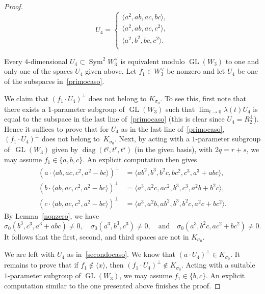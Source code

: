 \documentclass[JEP,XML,SOM,Unicode, NoEqCountersInSection,NoFloatCountersInSection]{cedram}
\theoremstyle{definition}
\let\la\langle
\let\ra\rangle
\DeclareMathOperator{\GL}{GL}
\DeclareMathOperator{\Sym}{Sym}
\DeclareMathOperator{\diag}{diag}
\begin{document}
\begin{proof}
\begin{minipage}[m]{.5\textwidth}
\end{minipage}
\hfill
{}
\hfill
\begin{minipage}[m]{.4\textwidth}
\begin{equation}\label{secondocaso}
U_4=
\begin{cases}
\la a^2,ab,ac,bc\ra, \\
\la a^2,ab,ac,c^2\ra, \\
\la a^2,b^2,bc,c^2\ra.\\
\end{cases}
\end{equation}
\end{minipage}
\par\smallskip\noindent
Every $4$-dimensional $U_4\subset \Sym^2 \!W^{\vee}_3$ is equivalent modulo $\GL(W_3)$ to one and only one of the spaces $U_4$ given above. Let $ f_1\in W_3^{\vee}$ be nonzero and let $U_4$ be one of the subspaces in~\eqref{primocaso}.

We claim that $(f_1\cdot U_4)^{\bot}$ does not belong to $K_{\sigma_0}$. To see this, first note that there exists a $1$-parameter subgroup of $\GL(W_3)$ such that $\lim_{t\to 0}\lambda(t)U_4$ is equal to the subspace in the last line of~\eqref{primocaso} (this is clear since $U_4=R_2^{\bot}$). Hence it suffices
to prove that for $U_4$ as in the last line of~\eqref{primocaso}, $(f_1\cdot U_4)^{\bot}$ does not belong to~$K_{\sigma_0}$. Next, by acting with a $1$-parameter subgroup of~$\GL(W_3)$ given by $\diag(t^q,t^r,t^s)$ (in the given basis), with $2q=r+s$, we may assume $f_1\in\{a,b,c\}$. An explicit computation then gives
\begin{align*}
(a\cdot \la ab,ac,c^2,a^2-bc\ra)^{\bot} & = \la ab^2,b^3,b^2c,bc^2,c^3,a^3+abc\ra, \\
(b\cdot \la ab,ac,c^2,a^2-bc\ra)^{\bot} & = \la a^3,a^2 c,ac^2,b^3,c^3,a^2b+b^2c\ra, \\
(c\cdot \la ab,ac,c^2,a^2-bc\ra)^{\bot} & = \la a^3,a^2 b,ab^2,b^3,b^2c,a^2c+bc^2\ra.
\end{align*}
By Lemma~\ref{nonzero}, we have
\[
\sigma_0(b^3,c^3,a^3+abc)\ne 0,\quad\sigma_0(a^3,b^3,c^3)\ne 0,\quad\text{and}\quad\sigma_0(a^3,b^2c,ac^2+bc^2)\ne 0.
\]
It follows that the first, second, and third spaces are not in $K_{\sigma_0}$.

We are left with $U_4$ as in~\eqref{secondocaso}. We know that $(a\cdot U_4)^{\bot}\in K_{\sigma_0}$. It remains to prove that if $f_1\notin\la x\ra$, then $(f_1\cdot U_4)^{\bot}\notin K_{\sigma_0}$. Acting with a suitable $1$-parameter subgroup of
$\GL(W_3)$, we may assume $f_1\in\{b,c\}$. An explicit computation similar to the one presented above finishes the proof.
\end{proof}
\end{document}
